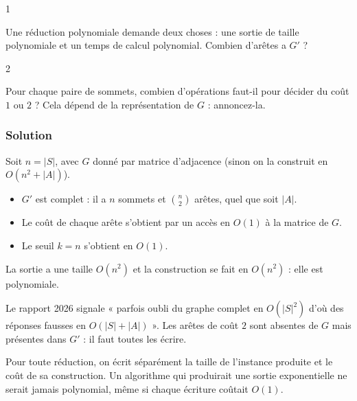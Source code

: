 \documentclass[11pt,a4paper]{article}
\providecommand{\tightlist}{\setlength{\itemsep}{0pt}\setlength{\parskip}{0pt}}
\begin{document}
\begin{indication}{1}

Une réduction polynomiale demande deux choses : une sortie de taille polynomiale et un temps de calcul polynomial. Combien d'arêtes a \(G'\) ?

\end{indication}

\begin{indication}{2}

Pour chaque paire de sommets, combien d'opérations faut-il pour décider du coût \(1\) ou \(2\) ? Cela dépend de la représentation de \(G\) : annoncez-la.

\end{indication}

\hypertarget{solution-2}{%
\subsubsection{Solution}\label{solution-2}}

Soit \(n=|S|\), avec \(G\) donné par matrice d'adjacence (sinon on la construit en \(O(n^2+|A|)\)).

\begin{itemize}
\tightlist
\item
  \(G'\) est complet : il a \(n\) sommets et \(\binom n2\) arêtes, quel que soit \(|A|\).
\item
  Le coût de chaque arête s'obtient par un accès en \(O(1)\) à la matrice de \(G\).
\item
  Le seuil \(k=n\) s'obtient en \(O(1)\).
\end{itemize}

La sortie a une taille \(O(n^2)\) et la construction se fait en \textbf{\(O(n^2)\)} : elle est polynomiale.

\begin{piege}

Le rapport 2026 signale « parfois oubli du graphe complet en \(O(|S|^2)\) d'où des réponses fausses en \(O(|S|+|A|)\) ». Les arêtes de coût \(2\) sont absentes de \(G\) mais présentes dans \(G'\) : il faut toutes les écrire.

\end{piege}

\begin{methode}

Pour toute réduction, on écrit séparément la taille de l'instance produite et le coût de sa construction. Un algorithme qui produirait une sortie exponentielle ne serait jamais polynomial, même si chaque écriture coûtait \(O(1)\).

\end{methode}
\end{document}
